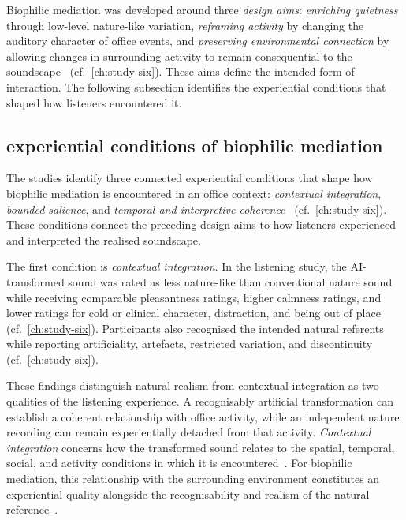 Biophilic mediation was developed around three \emph{design aims}: \emph{enriching quietness} through low-level nature-like variation, \emph{reframing activity} by changing the auditory character of office events, and \emph{preserving environmental connection} by allowing changes in surrounding activity to remain consequential to the soundscape~\cite{rao2027biophilic} (cf.~\autoref{ch:study-six}). These aims define the intended form of interaction. The following subsection identifies the experiential conditions that shaped how listeners encountered it.


\subsection{experiential conditions of biophilic mediation}
\label{subsec:moss-experiential-conditions}

The studies identify three connected experiential conditions that shape how biophilic mediation is encountered in an office context: \emph{contextual integration}, \emph{bounded salience}, and \emph{temporal and interpretive coherence}~\cite{rao2027biophilic} (cf.~\autoref{ch:study-six}). These conditions connect the preceding design aims to how listeners experienced and interpreted the realised soundscape.

The first condition is \emph{contextual integration}. In the listening study, the AI-transformed sound was rated as less nature-like than conventional nature sound while receiving comparable pleasantness ratings, higher calmness ratings, and lower ratings for cold or clinical character, distraction, and being out of place~\cite{rao2027biophilic} (cf.~\autoref{ch:study-six}). Participants also recognised the intended natural referents while reporting artificiality, artefacts, restricted variation, and discontinuity (cf.~\autoref{ch:study-six}).

These findings distinguish natural realism from contextual integration as two qualities of the listening experience. A recognisably artificial transformation can establish a coherent relationship with office activity, while an independent nature recording can remain experientially detached from that activity. \emph{Contextual integration} concerns how the transformed sound relates to the spatial, temporal, social, and activity conditions in which it is encountered~\cite{thi2026envisioning}. For biophilic mediation, this relationship with the surrounding environment constitutes an experiential quality alongside the recognisability and realism of the natural reference~\cite{newbold2017nature,yu2016auditory,riaz2025bird}.

